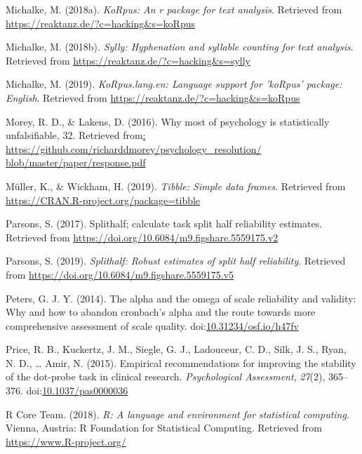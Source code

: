 \documentclass[english,,man,floatsintext]{apa6}
\begin{document}
\leavevmode\hypertarget{ref-R-koRpus}{}%
Michalke, M. (2018a). \emph{KoRpus: An r package for text analysis}. Retrieved from \url{https://reaktanz.de/?c=hacking\&s=koRpus}

\leavevmode\hypertarget{ref-R-sylly}{}%
Michalke, M. (2018b). \emph{Sylly: Hyphenation and syllable counting for text analysis}. Retrieved from \url{https://reaktanz.de/?c=hacking\&s=sylly}

\leavevmode\hypertarget{ref-R-koRpus.lang.en}{}%
Michalke, M. (2019). \emph{KoRpus.lang.en: Language support for 'koRpus' package: English}. Retrieved from \url{https://reaktanz.de/?c=hacking\&s=koRpus}

\leavevmode\hypertarget{ref-morey_why_2016}{}%
Morey, R. D., \& Lakens, D. (2016). Why most of psychology is statistically unfalsiﬁable, 32. Retrieved from\href{:\%20https://github.com/richarddmorey/psychology_resolution/\%20blob/master/paper/response.pdf}{: https://github.com/richarddmorey/psychology\_resolution/ blob/master/paper/response.pdf}

\leavevmode\hypertarget{ref-R-tibble}{}%
Müller, K., \& Wickham, H. (2019). \emph{Tibble: Simple data frames}. Retrieved from \url{https://CRAN.R-project.org/package=tibble}

\leavevmode\hypertarget{ref-R-splithalf}{}%
Parsons, S. (2017). Splithalf; calculate task split half reliability estimates. Retrieved from \url{https://doi.org/10.6084/m9.figshare.5559175.v2}

\leavevmode\hypertarget{ref-parsons_splithalf:_2019}{}%
Parsons, S. (2019). \emph{Splithalf: Robust estimates of split half reliability}. Retrieved from \url{https://doi.org/10.6084/m9.figshare.5559175.v5}

\leavevmode\hypertarget{ref-peters_alpha_2014}{}%
Peters, G. J. Y. (2014). The alpha and the omega of scale reliability and validity: Why and how to abandon cronbach's alpha and the route towards more comprehensive assessment of scale quality. doi:\href{https://doi.org/10.31234/osf.io/h47fv}{10.31234/osf.io/h47fv}

\leavevmode\hypertarget{ref-price_empirical_2015}{}%
Price, R. B., Kuckertz, J. M., Siegle, G. J., Ladouceur, C. D., Silk, J. S., Ryan, N. D., \ldots{} Amir, N. (2015). Empirical recommendations for improving the stability of the dot-probe task in clinical research. \emph{Psychological Assessment}, \emph{27}(2), 365--376. doi:\href{https://doi.org/10.1037/pas0000036}{10.1037/pas0000036}

\leavevmode\hypertarget{ref-R-base}{}%
R Core Team. (2018). \emph{R: A language and environment for statistical computing}. Vienna, Austria: R Foundation for Statistical Computing. Retrieved from \url{https://www.R-project.org/}
\end{document}
